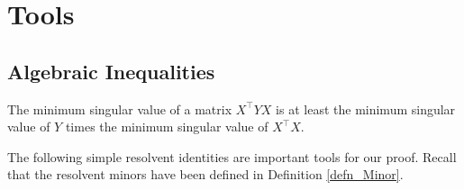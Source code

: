 \section{Tools}\label{app_tool}

\subsection{Algebraic Inequalities}

\begin{fact}\label{fact_proof_gA}
	The minimum singular value of a matrix $X^{\top}YX$ is at least the minimum singular value of $Y$ times the minimum singular value of $X^{\top}X$.
\end{fact}

The following simple resolvent identities are important tools for our proof. Recall that the resolvent minors have been defined in Definition \ref{defn_Minor}.
